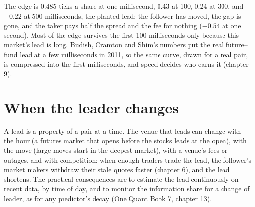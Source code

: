 \begin{omfigure}

\label{fig:hf:lead-lag-and-cross-venue-trading:edge}
\end{omfigure}

The edge is 0.485 ticks a share at one millisecond, 0.43 at 100, 0.24 at 300, and $-0.22$ at 500 milliseconds, the planted lead: the follower has
moved, the gap is gone, and the taker pays half the spread and the fee for nothing ($-0.54$ at one second). Most of the edge survives the first 100
milliseconds only because this market's lead is long. Budish, Cramton and Shim's numbers put the real future--fund lead at a few milliseconds in 2011,
so the same curve, drawn for a real pair, is compressed into the first milliseconds, and speed decides who earns it (chapter 9).

\section{When the leader changes}

A lead is a property of a pair at a time. The venue that leads can change with the hour (a futures market that opens before the stocks leads at the
open), with the move (large moves start in the deepest market), with a venue's fees or outages, and with competition: when enough traders trade the
lead, the follower's market makers withdraw their stale quotes faster (chapter 6), and the lead shortens. The practical consequences are to estimate
the lead continuously on recent data, by time of day, and to monitor the information share for a change of leader, as for any predictor's decay
(One Quant Book 7, chapter 13).

